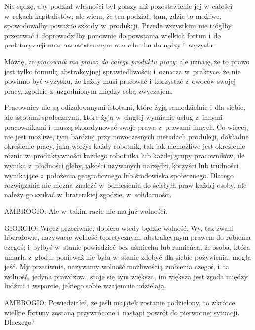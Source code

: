 \documentclass[oneside,polish,11pt,sfheadings]{mwbk}
\begin{document}
 
Nie sądzę, aby podział własności był gorszy niż pozostawienie jej w~całości w~rękach kapitalistów; ale wiem, że ten
podział, tam, gdzie to możliwe, spowodowałby poważne szkody w~produkcji. Przede wszystkim nie mógłby przetrwać i~doprowadziłby ponownie do powstania wielkich fortun i~do proletaryzacji mas, aw ostatecznym rozrachunku do nędzy i~wyzysku. 

 
Mówię, że \textit{pracownik ma prawo do całego produktu pracy}: ale uznaję, że to prawo jest tylko formułą
abstrakcyjnej sprawiedliwości; i~oznacza w~praktyce, że nie powinno być wyzysku, że każdy musi pracować i~korzystać z~owoców swojej pracy, zgodnie z~uzgodnionym między sobą zwyczajem. 

 
Pracownicy nie są odizolowanymi istotami, które żyją samodzielnie i~dla siebie, ale istotami społecznymi, które żyją w~ciągłej wymianie usług z~innymi pracownikami i~muszą skoordynować swoje prawa z~prawami innych. Co więcej, nie jest
możliwe, tym bardziej przy nowoczesnych metodach produkcji, dokładne określenie pracy, jaką włożył każdy robotnik, tak
jak niemożliwe jest określenie różnic w~produktywności każdego robotnika lub każdej grupy pracowników, ile wynika z~płodności gleby, jakości używanych narzędzi, korzyści lub trudności wynikające z~położenia geograficznego lub
środowiska społecznego. Dlatego rozwiązania nie można znaleźć w~odniesieniu do ścisłych praw każdej osoby, ale należy
go szukać w~braterskiej zgodzie, w~solidarności. 




 
\noindent AMBROGIO: Ale w~takim razie nie ma już wolności. 




 
\noindent GIORGIO: Wręcz przeciwnie, dopiero wtedy będzie wolność. Wy, tak zwani liberałowie, nazywacie wolność teoretycznym,
abstrakcyjnym prawem do robienia czegoś; i~byłbyś w~stanie powiedzieć bez uśmiechu lub rumieńca, że osoba, która
umarła z~głodu, ponieważ nie była w~stanie zdobyć dla siebie pożywienia, mogła jeść. My przeciwnie, nazywamy wolność
możliwością zrobienia czegoś, i~ta wolność, jedyna prawdziwa, staje się tym większa, im większa jest zgoda między
ludźmi i~wsparcie, jakiego sobie wzajemnie udzielają. 




 
\noindent AMBROGIO: Powiedziałeś, że jeśli majątek zostanie podzielony, to wkrótce wielkie fortuny zostaną przywrócone i~nastąpi
powrót do pierwotnej sytuacji. Dlaczego? 
\end{document}
